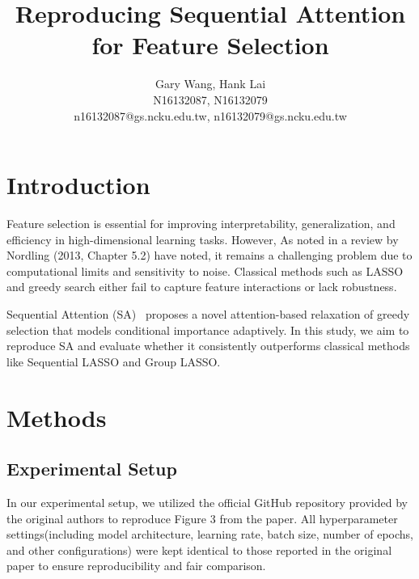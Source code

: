 \documentclass[a4paper,twocolumn]{article} %
\begin{document}

\title{Reproducing Sequential Attention for Feature Selection}
\author{Gary Wang, Hank Lai \\ N16132087, N16132079 \\ n16132087@gs.ncku.edu.tw, n16132079@gs.ncku.edu.tw} 

\maketitle                     %





\section{Introduction}

Feature selection is essential for improving interpretability, generalization, and efficiency in high-dimensional learning tasks.
 However, As noted in a review by Nordling (2013, Chapter 5.2) have noted, it remains a challenging problem due to 
computational limits and sensitivity to noise. Classical methods such as LASSO and greedy search either fail to capture feature interactions or lack robustness.

Sequential Attention (SA)~\cite{yasuda2023} proposes a novel attention-based relaxation of greedy selection that models conditional importance adaptively. 
In this study, we aim to reproduce SA and evaluate whether it consistently outperforms classical methods 
like Sequential LASSO and Group LASSO.


\section{Methods}

\subsection{Experimental Setup}
In our experimental setup, we utilized the official GitHub repository provided by the original authors to reproduce Figure 3 from the paper. All hyperparameter settings(including model architecture, learning rate, batch size, number of epochs, and other configurations) were kept identical to those reported in the original paper to ensure reproducibility and fair comparison.
\end{document}
